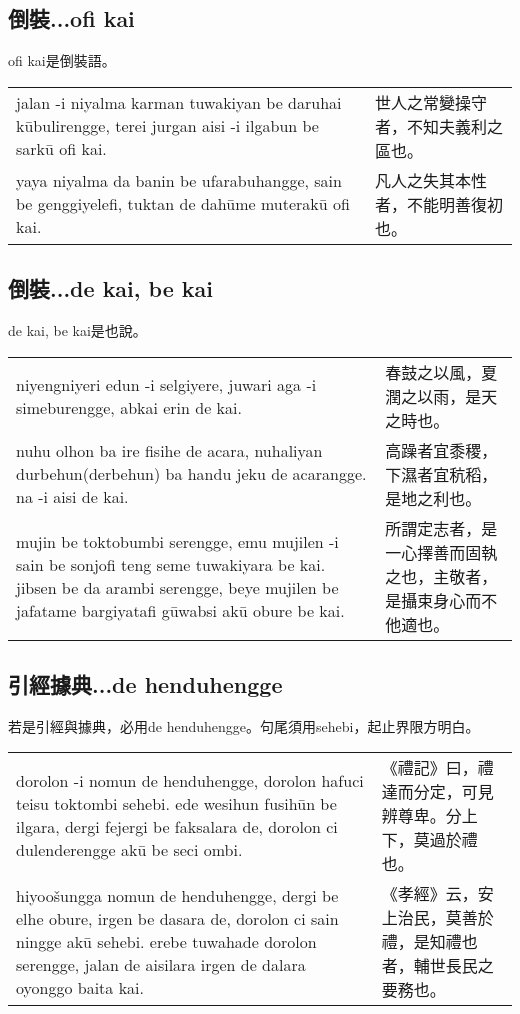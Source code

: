 \documentclass{article}
\begin{document}
\subsection{倒裝...ofi kai}
\noindent ofi kai是倒裝語。
\begin{center}
    \begin{tabularx}{\textwidth}{XX}
        jalan -i niyalma karman tuwakiyan be daruhai k\={u}bulirengge, terei jurgan aisi -i ilgabun be sark\={u} ofi kai. & 世人之常變操守者，不知夫義利之區也。\\
        yaya niyalma da banin be ufarabuhangge, sain be genggiyelefi, tuktan de dah\={u}me muterak\={u} ofi kai. &凡人之失其本性者，不能明善復初也。
    \end{tabularx}
\end{center}

\subsection{倒裝...de kai, be kai}
\noindent de kai, be kai是也說。
\begin{center}
    \begin{tabularx}{\textwidth}{XX}
        niyengniyeri edun -i selgiyere, juwari aga -i simeburengge, abkai erin de kai. & 春鼓之以風，夏潤之以雨，是天之時也。\\
        nuhu olhon ba ire fisihe de acara, nuhaliyan durbehun(derbehun) ba handu jeku de acarangge. na -i aisi de kai. & 高躁者宜黍稷，下濕者宜秔稻，是地之利也。\\
        mujin be toktobumbi serengge, emu mujilen -i sain be sonjofi teng seme tuwakiyara be kai. jibsen be da arambi serengge, beye mujilen be jafatame bargiyatafi g\={u}wabsi ak\={u} obure be kai. & 所謂定志者，是一心擇善而固執之也，主敬者，是攝束身心而不他適也。
    \end{tabularx}
\end{center}

\subsection{引經據典...de henduhengge}
\noindent 若是引經與據典，必用de henduhengge。句尾須用sehebi，起止界限方明白。
\begin{center}
    \begin{tabularx}{\textwidth}{XX}
        dorolon -i nomun de henduhengge, dorolon hafuci teisu toktombi sehebi. ede wesihun fusih\={u}n be ilgara, dergi fejergi be faksalara de, dorolon ci dulenderengge ak\={u} be seci ombi. & 《禮記》曰，禮達而分定，可見辨尊卑。分上下，莫過於禮也。\\
        hiyoo\v{s}ungga nomun de henduhengge, dergi be elhe obure, irgen be dasara de, dorolon ci sain ningge ak\={u} sehebi. erebe tuwahade dorolon serengge, jalan de aisilara irgen de dalara oyonggo baita kai. & 《孝經》云，安上治民，莫善於禮，是知禮也者，輔世長民之要務也。
    \end{tabularx}
\end{center}
\end{document}
